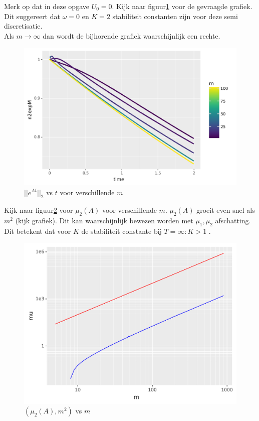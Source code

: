 \documentclass{article}
\begin{document}
Merk op dat in deze opgave $U_{0}=0$.
Kijk naar figuur\ref{fig:mnexp} voor de gevraagde grafiek. Dit suggereert 
dat $\omega = 0$ en $K = 2$ stabiliteit constanten
zijn voor deze semi discretisatie. \\
Als $m \rightarrow \infty$ dan wordt de bijhorende grafiek waarschijnlijk
een rechte.

\begin{figure}
\includegraphics[width=\linewidth]{oefening2.png}
\caption{ $||e^{At}||_{2}$ vs $t$ voor verschillende $m$}\label{fig:mnexp}
\end{figure}

Kijk naar figuur\ref{fig:muA} voor $\mu_{2}(A)$ voor verschillende $m$. 
$\mu_{2}(A)$ groeit even snel als $m^{2}$ (kijk grafiek). Dit kan waarschijnlijk
bewezen worden met $\mu_{1}, \mu_{2}$ afschatting. Dit betekent dat voor  
$K$ de stabiliteit constante bij $T = \infty: K > 1$ .

\begin{figure}
\includegraphics[width=\linewidth]{oefening3.png}
\caption{ $(\mu_{2}(A), m^2)$ vs $m$}\label{fig:muA}
\end{figure}
\end{document}

